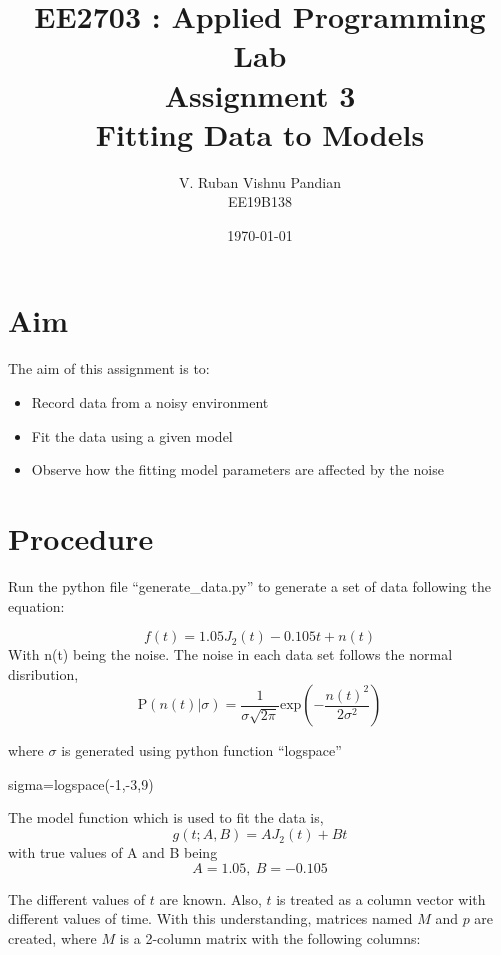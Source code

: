 \documentclass[12pt, a4paper]{report}
\title{\textbf{EE2703 : Applied Programming Lab \\ Assignment 3 \\ Fitting Data to Models}}
\author{V. Ruban Vishnu Pandian \\ EE19B138} %
\date{\today} %
\begin{document}
		
		
\maketitle %

\section*{Aim}
The aim of this assignment is to:
\begin{itemize}
  	\item Record data from a noisy environment
  	\item Fit the data using a given model
	\item Observe how the fitting model parameters are affected by the noise
 \end{itemize}

\section*{Procedure}
Run the python file ``generate\_data.py'' to generate a set of data following the equation:
 
 \begin{equation}\label{eq:1}
f(t)=1.05J_{2}(t)-0.105t+n(t)
 \end{equation}
 With n(t) being the noise. The noise in each data set follows the normal disribution,
 \begin{equation*}
\mathrm{P}(n(t)|\sigma)=\frac{1}{\sigma\sqrt{2\pi}}\text{exp}\left(-\frac{n(t)^{2}}{2\sigma^{2}}\right)
 \end{equation*}
 
 where $\sigma$ is generated using python function ``logspace''

\begin{psudo}
sigma=logspace(-1,-3,9)
\end{psudo}

The model function which is used to fit the data is,
\begin{equation}\label{eq:2}
g(t;A,B)=AJ_{2}(t)+Bt
\end{equation}
with true values of A and B being
\begin{equation*}
A=1.05,\ B=-0.105
\end{equation*}

The different values of $t$ are known. Also, $t$ is treated as a column vector with different values of time. With this understanding, matrices named $M$ and $p$ are created, where $M$ is a 2-column matrix with the following columns:
\end{document}
